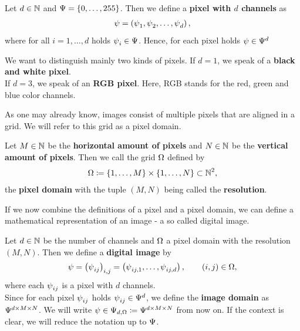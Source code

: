 \begin{definition}\label{def:pixel}
Let $d\in\N$ and $\P=\{0,\ldots,255\}$. Then we define a \textbf{pixel with $d$ channels} as
\begin{align*}
\p = \left(\p_1, \p_2,\ldots, \p_d\right),
\end{align*}
where for all $i=1,\ldots,d$ holds $\p_i\in\P$. Hence, for each pixel holds $\p\in\P^d$
\end{definition}


\begin{remark}
We want to distinguish mainly two kinds of pixels. If $d=1$, we speak of a \textbf{black and white pixel}.\\
If $d=3$, we speak of an \textbf{RGB pixel}. Here, RGB stands for the  red, green and blue color channels.
\end{remark}


As one may already know, images consist of multiple pixels that are aligned in a grid. We will refer to this grid as a pixel domain.


\begin{definition}\label{def:pixel_domain}
Let $M\in\N$ be the \textbf{horizontal amount of pixels} and $N\in\N$ be the \textbf{vertical amount of pixels}. Then we call the grid $\O$ defined by
\begin{align*}
\O \coloneqq \left\{1, \ldots, M\right\} \times \left\{1,\ldots, N\right\} \subset \N^2,
\end{align*}
the \textbf{pixel domain} with the tuple $(M,N)$ being called the \textbf{resolution}.
\end{definition}


If we now combine the definitions of a pixel and a pixel domain, we can define a mathematical representation of an image - a so called digital image.


\begin{definition}\label{def:image}
Let $d\in\N$ be the number of channels and $\O$ a pixel domain with the resolution $(M,N)$. Then we define a \textbf{digital image} by
\begin{align*}
\p=\left(\p_{ij}\right)_{i,j} = \left(\p_{ij,1},\ldots,\p_{ij,d} \right),\qquad (i,j)\in\O,
\end{align*}
where each $\p_{ij}$ is a pixel with $d$ channels.\\
Since for each pixel $\p_{ij}$ holds $\p_{ij}\in\P^d$, we define the \textbf{image domain} as $\P^{d\times M\times N}$. We will write $\p\in\P_{d,\O}\coloneqq \P^{d \times M\times N}$ from now on. If the context is clear, we will reduce the notation up to $\P$.
\end{definition}


